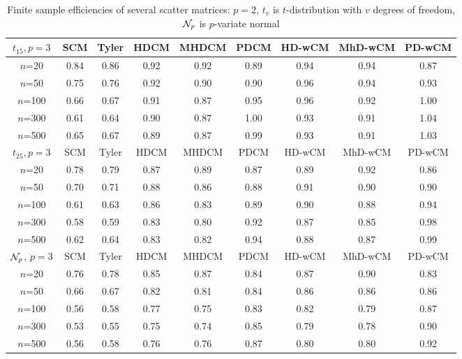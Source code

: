 \begin{table}[ht]
\begin{footnotesize}
\begin{tabular}{c|cc|ccc|ccc}
    $t_{15}, p=3$ & SCM  & Tyler & HDCM & MHDCM & PDCM & HD-wCM & MhD-wCM & PD-wCM \\ \hline
    $n$=20             & 0.84 & 0.86  & 0.92   & 0.92   & 0.89  & 0.94    & 0.94    & 0.87   \\
    $n$=50             & 0.75 & 0.76  & 0.92   & 0.90   & 0.90  & 0.96    & 0.94    & 0.93   \\
    $n$=100            & 0.66 & 0.67  & 0.91   & 0.87   & 0.95  & 0.96    & 0.92    & 1.00   \\
    $n$=300            & 0.61 & 0.64  & 0.90   & 0.87   & 1.00  & 0.93    & 0.91    & 1.04   \\
    $n$=500            & 0.65 & 0.67  & 0.89   & 0.87   & 0.99  & 0.93    & 0.91    & 1.03   \\ \hline
    $t_{25}, p=3$ & SCM  & Tyler & HDCM & MHDCM & PDCM & HD-wCM & MhD-wCM & PD-wCM \\ \hline
    $n$=20             & 0.78 & 0.79  & 0.87   & 0.89   & 0.87  & 0.89    & 0.92    & 0.86   \\
    $n$=50             & 0.70 & 0.71  & 0.88   & 0.86   & 0.88  & 0.91    & 0.90    & 0.90   \\
    $n$=100            & 0.61 & 0.63  & 0.86   & 0.83   & 0.89  & 0.90    & 0.88    & 0.94   \\
    $n$=300            & 0.58 & 0.59  & 0.83   & 0.80   & 0.92  & 0.87    & 0.85    & 0.98   \\
    $n$=500            & 0.62 & 0.64  & 0.83   & 0.82   & 0.94  & 0.88    & 0.87    & 0.99   \\ \hline
    ${\cal{N}}_p$, $p=3$   & SCM  & Tyler & HDCM & MHDCM & PDCM & HD-wCM & MhD-wCM & PD-wCM \\ \hline
    $n$=20             & 0.76 & 0.78  & 0.85   & 0.87   & 0.84  & 0.87    & 0.90    & 0.83   \\
    $n$=50             & 0.66 & 0.67  & 0.82   & 0.81   & 0.84  & 0.86    & 0.86    & 0.86   \\
    $n$=100            & 0.56 & 0.58  & 0.77   & 0.75   & 0.83  & 0.82    & 0.79    & 0.87   \\
    $n$=300            & 0.53 & 0.55  & 0.75   & 0.74   & 0.85  & 0.79    & 0.78    & 0.90   \\
    $n$=500            & 0.56 & 0.58  & 0.76   & 0.76   & 0.87  & 0.80    & 0.80    & 0.92   \\ \hline
    \end{tabular}
\caption{Finite sample efficiencies of several scatter matrices: $p=2$, $t_v$ is $t$-distribution with $v$ degrees of freedom, ${\cal{N}}_p$ is $p$-variate normal}
\label{table:FSEtable3}
\end{footnotesize}
\end{table}
